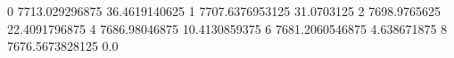 0 7713.029296875 36.4619140625
1 7707.6376953125 31.0703125
2 7698.9765625 22.4091796875
4 7686.98046875 10.4130859375
6 7681.2060546875 4.638671875
8 7676.5673828125 0.0
